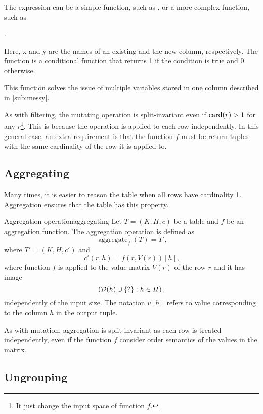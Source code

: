 The expression can be a simple function, such as , or a more complex
function, such as
\begin{center}
  .
\end{center}
Here, x and y are the names of an existing and the new column, respectively. The
 function is a conditional function that returns 1 if the condition
is true and 0 otherwise.

This function solves the issue of multiple variables stored in one column described in
\cref{sub:messy}.

As with filtering, the mutating operation is split-invariant even if $\rowcard[r] > 1$ for
any $r$\footnote{It just change the input space of function $f$.}.  This is because the
operation is applied to each row independently.  In this general case, an extra
requirement is that the function $f$ must be return tuples with the same cardinality of
the row it is applied to.

\subsection{Aggregating}
\label{sub:aggregation}

Many times, it is easier to reason the table when all rows have cardinality 1.
Aggregation ensures that the table has this property.

\begin{defbox}{Aggregation operation}{aggregating}
  Let $T = (K, H, c)$ be a table and $f$ be an aggregation function.  The aggregation
  operation is defined as \[
    \operatorname{aggregate}_{f}(T) = T'\text{,}
  \] where $T' = (K, H, c')$ and \[
    c'(r, h) = f(r, V(r))[h]\text{,}
  \] where function $f$ is applied to the value matrix $V(r)$ of the row $r$ and it has
  image $$\left(\domainof{h} \cup \{?\} : h \in H\right)\text{,}$$ independently of the
  input size.  The notation $v[h]$ refers to value corresponding to the column $h$ in the
  output tuple.
\end{defbox}

As with mutation, aggregation is split-invariant as each row is treated independently,
even if the function $f$ consider order semantics of the values in the matrix.

\subsection{Ungrouping}
\label{sub:ungrouping}

